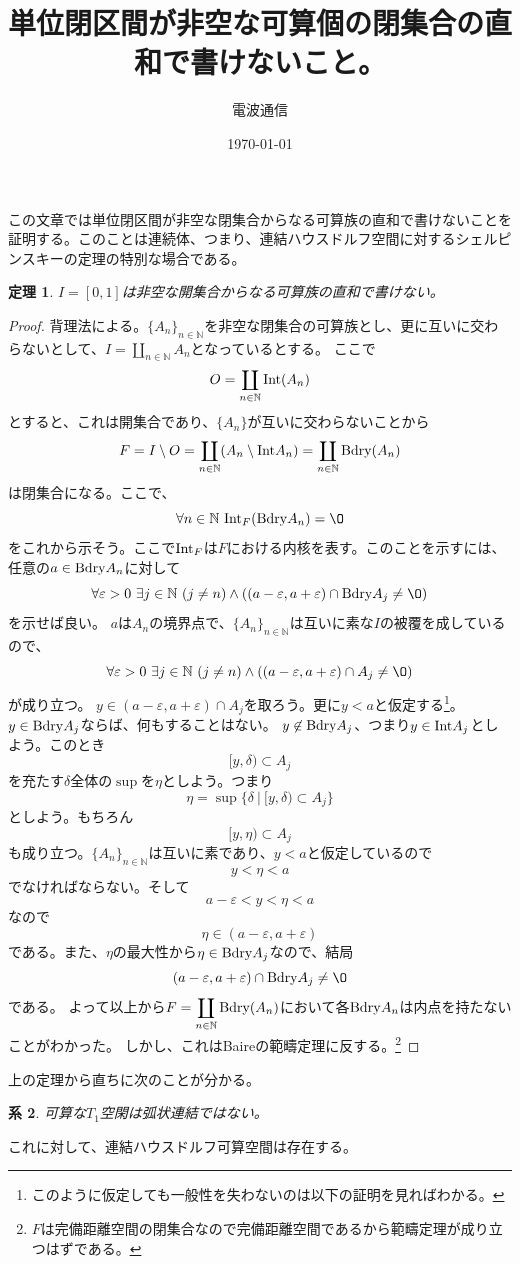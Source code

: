 \documentclass[leqno]{jsarticle}
\title{単位閉区間が非空な可算個の閉集合の直和で書けないこと。}
\author{電波通信}
\date{\today}
\newtheorem{thm}{定理}
\newtheorem{cor}[thm]{系}
\newcommand{\nn}{\mathbb{N}}
\newcommand{\dpst}{\displaystyle}
\newcommand{\ep}{\varepsilon}
\newcommand{\bd}{\text{{\rm Bdry}}}
\newcommand{\nai}{\text{{\rm Int}}}
\begin{document}
\maketitle
この文章では単位閉区間が非空な閉集合からなる可算族の直和で書けないことを証明する。このことは連続体、つまり、連結ハウスドルフ空間に対するシェルピンスキーの定理の特別な場合である。
\begin{thm}
$I=[0,1]$は非空な開集合からなる可算族の直和で書けない。
\end{thm}
\begin{proof}
背理法による。$\{A_n\}_{n\in \nn}$を非空な閉集合の可算族とし、更に互いに交わらないとして、$\dpst I=\coprod_{n\in \nn}A_n$となっているとする。
ここで
\[
O=\coprod_{n\in \nn}\nai(A_n)
\]
とすると、これは開集合であり、$\{A_n\}$が互いに交わらないことから
\[
F=I\setminus O=\coprod_{n\in \nn}(A_n\setminus \nai A_n)=\coprod_{n\in \nn}\bd(A_n)
\]
は閉集合になる。ここで、
\[
\forall n\in\nn\  \nai_{F}(\bd A_n)=\O
\]
をこれから示そう。ここで$\nai_F$は$F$における内核を表す。このことを示すには、任意の$a\in \bd A_n$に対して
\[
\forall\ep>0\ \exists j\in \nn\ (j\neq n)\land((a-\ep,a+\ep)\cap\bd A_j\neq \O)
\]
を示せば良い。
$a$は$A_n$の境界点で、$\{A_n\}_{n\in \nn}$は互いに素な$I$の被覆を成しているので、
\[
\forall\ep>0\ \exists j\in \nn\ (j\neq n)\land((a-\ep,a+\ep)\cap A_j\neq \O)
\]
が成り立つ。
$y\in (a-\ep,a+\ep)\cap A_j$を取ろう。更に$y<a$と仮定する\footnote{このように仮定しても一般性を失わないのは以下の証明を見ればわかる。}。
$y\in \bd A_j$ならば、何もすることはない。
$y\not\in \bd A_j$、つまり$y\in \nai A_j$としよう。このとき
\[
[y,\delta)\subset A_j
\]
を充たす$\delta$全体の$\sup$を$\eta$としよう。つまり
\[
\eta=\sup\{\delta\ |\ [y,\delta)\subset A_j\}
\]
としよう。もちろん
\[
[y,\eta)\subset A_j
\]
も成り立つ。$\{A_n\}_{n\in \nn}$は互いに素であり、$y<a$と仮定しているので
\[
y<\eta<a
\]
でなければならない。そして
\[
a-\ep <y<\eta <a
\]
なので
\[
\eta\in (a-\ep,a+\ep)
\]
である。また、$\eta$の最大性から$\eta\in \bd A_j$なので、結局
\[
(a-\ep,a+\ep)\cap \bd A_j\neq \O
\]
である。
よって以上から$\dpst F=\coprod_{n\in \nn}\bd(A_n)$において各$\bd A_n$は内点を持たないことがわかった。
しかし、これはBaireの範疇定理に反する。\footnote{$F$は完備距離空間の閉集合なので完備距離空間であるから範疇定理が成り立つはずである。}
\end{proof}
上の定理から直ちに次のことが分かる。
\begin{cor}
可算な$T_1$空閑は弧状連結ではない。
\end{cor}


これに対して、連結ハウスドルフ可算空間は存在する。

















































			
\end{document}

